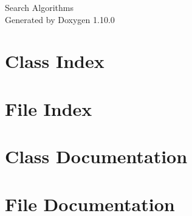 \documentclass[twoside]{book}
\newcommand{\+}{\discretionary{\mbox{\scriptsize$\hookleftarrow$}}{}{}}
\newcommand{\clearemptydoublepage}{%
    \newpage{\pagestyle{empty}\cleardoublepage}%
  }
\begin{document}
  \raggedbottom
    \hypersetup{pageanchor=false,
                bookmarksnumbered=true,
                pdfencoding=unicode
               }
  \begin{titlepage}
  \vspace*{7cm}
  \begin{center}%
  {\Large Search Algorithms}\\
  \vspace*{1cm}
  {\large Generated by Doxygen 1.10.0}\\
  \end{center}
  \end{titlepage}
  \clearemptydoublepage
  \tableofcontents
  \clearemptydoublepage
  \hypersetup{pageanchor=true}
\chapter{Class Index}

\chapter{File Index}

\chapter{Class Documentation}






\chapter{File Documentation}













  \backmatter
  \newpage
  \clearemptydoublepage
  \printindex
\end{document}
